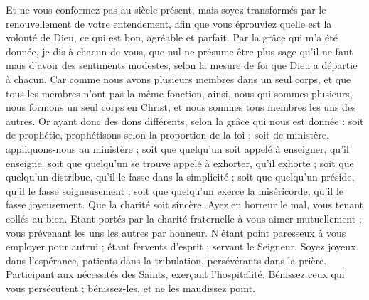 \begin{multicols}{2}
Et ne vous conformez pas au siècle présent, mais soyez transformés par le renouvellement de votre entendement, afin que vous éprouviez quelle est la volonté de Dieu, ce qui est bon, agréable et parfait.
Par la grâce qui m'a été donnée, je dis à chacun de vous, que nul ne présume être plus sage qu'il ne faut mais d'avoir des sentiments modestes, selon la mesure de foi que Dieu a départie à chacun.
Car comme nous avons plusieurs membres dans un seul corps, et que tous les membres n'ont pas la même fonction,
ainsi, nous qui sommes plusieurs, nous formons un seul corps en Christ, et nous sommes tous membres les uns des autres.
Or ayant donc des dons différents, selon la grâce qui nous est donnée : soit de prophétie, prophétisons selon la proportion de la foi ;
soit de ministère, appliquons-nous au ministère ; soit que quelqu'un soit appelé à enseigner, qu'il enseigne.
soit que quelqu'un se trouve appelé à exhorter, qu'il exhorte ; soit que quelqu'un distribue, qu'il le fasse dans la simplicité ; soit que quelqu'un préside, qu'il le fasse soigneusement ; soit que quelqu'un exerce la miséricorde, qu'il le fasse joyeusement.
Que la charité soit sincère. Ayez en horreur le mal, vous tenant collés au bien.
Etant portés par la charité fraternelle à vous aimer mutuellement ; vous prévenant les uns les autres par honneur.
N'étant point paresseux à vous employer pour autrui ; étant fervents d'esprit ; servant le Seigneur.
Soyez joyeux dans l'espérance, patients dans la tribulation, persévérants dans la prière.
Participant aux nécessités des Saints, exerçant l'hospitalité.
Bénissez ceux qui vous persécutent ; bénissez-les, et ne les maudissez point.

\end{multicols}

